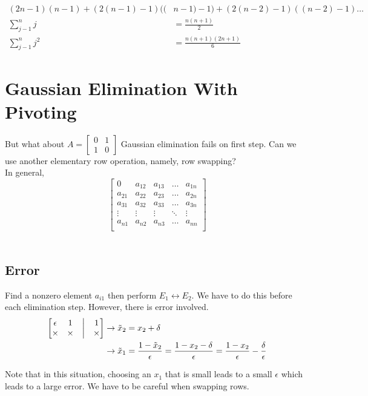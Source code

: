 \documentclass[12pt, letterpaper]{article}
\begin{document}
\begin{align*}
    (2n-1)(n-1)+(2(n-1)-1)((&n-1)-1)+(2(n-2)-1)((n-2)-1) \ldots \\
    \sum^n_{j-1} j &= \frac{n(n+1)}{2} \\
    \sum^n_{j-1} j^2 &= \frac{n(n+1)(2n+1)}{6}
\end{align*}

\section{Gaussian Elimination With Pivoting}
\noindent But what about $A=\begin{bmatrix}
    0 & 1 \\
    1 & 0
\end{bmatrix}$
Gaussian elimination fails on first step. Can we use another elementary row operation, namely, row swapping? \\

\noindent In general, \\
\[\begin{bmatrix}
    0 & a_{12} & a_{13} & \ldots & a_{1n} \\
    a_{21} & a_{22} & a_{23} & \ldots & a_{2n} \\
    a_{31} & a_{32} & a_{33} & \ldots & a_{3n} \\
    \vdots & \vdots & \vdots & \ddots & \vdots \\
    a_{n1} & a_{n2} & a_{n3} & \ldots & a_{nn} \\    
\end{bmatrix}\] \\
\subsection{Error}
Find a nonzero element $a_{i1}$ then perform $E_1\leftrightarrow E_2$. We have to do this before each elimination step.
However, there is error involved.
\begin{align*}
\begin{bmatrix}
    \epsilon & 1 & \bigl{|}  & 1\\
    \times & \times & \bigl{|} & \times
\end{bmatrix} &\rightarrow
    \tilde{x}_2=x_2 + \delta \\
    &\rightarrow \tilde{x}_1=\frac{1-\tilde{x}_2}{\epsilon} = \frac{1-x_2-\delta}{\epsilon} = \frac{1-x_2}{\epsilon}-\frac{\delta}{\epsilon}
\end{align*}

\noindent Note that in this situation, choosing an $x_1$ that is small leads to a small $\epsilon$ which leads to a large error. We have to be careful when swapping rows. \\
\end{document}
